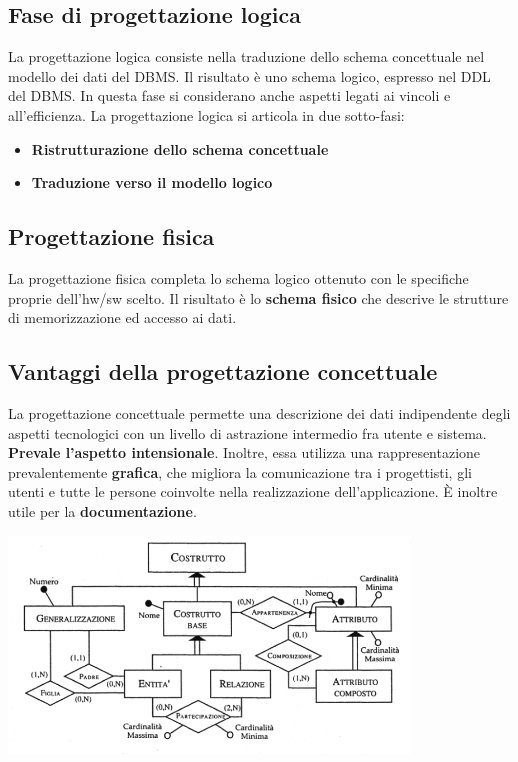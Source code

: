 \documentclass[12pt]{article}
\begin{document}
\subsection{Fase di progettazione logica}
La progettazione logica consiste nella traduzione dello schema concettuale nel modello dei dati del DBMS.
Il risultato è uno schema logico, espresso nel DDL del DBMS.
In questa fase si considerano anche aspetti legati ai vincoli e all'efficienza.
La progettazione logica si articola in due sotto-fasi:
\begin{itemize}
    \item \textbf{Ristrutturazione dello schema concettuale}
    \item \textbf{Traduzione verso il modello logico}
\end{itemize}
\subsection{Progettazione fisica}
La progettazione fisica completa lo schema logico ottenuto con le specifiche proprie dell'hw/sw scelto.
Il risultato è lo \textbf{schema fisico} che descrive le strutture di memorizzazione ed accesso ai dati.
\subsection{Vantaggi della progettazione concettuale}
La progettazione concettuale permette una descrizione dei dati indipendente degli aspetti tecnologici con un livello di astrazione intermedio fra utente e sistema.
\textbf{Prevale l'aspetto intensionale}.
Inoltre, essa utilizza una rappresentazione prevalentemente \textbf{grafica}, che migliora la comunicazione tra i progettisti, gli utenti e tutte le persone coinvolte nella realizzazione dell'applicazione.
È inoltre utile per la \textbf{documentazione}.
\begin{center}
    \includegraphics[width = 0.80\textwidth]{Images/14.PNG}
\end{center}
\end{document}
